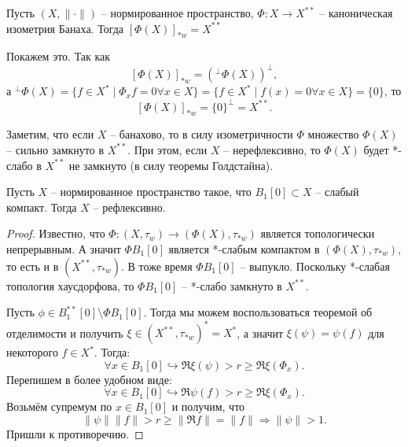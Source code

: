 \begin{note}\label{th:goldstein}
    Пусть $(X, \|\cdot\|)$ -- нормированное пространство, $\Phi\colon X \to X^{**}$ -- каноническая изометрия Банаха.
    Тогда $[\Phi(X)]_{*w} = X^{**}$

    Покажем это.
    Так как
    \[
        [\Phi(X)]_{*w} = (^\perp \Phi(X))^{\perp},
    \]
    а $^\perp \Phi(X) = \{f \in X^* \mid \Phi_x f = 0 \forall x \in X \} = \{f \in X^* \mid f(x) = 0 \forall x \in X\} = \{0\}$,
    то
    \[
        [\Phi(X)]_{*w} = \{0\}^{\perp} = X^{**}.
    \]
\end{note}
\begin{note}\label{cor:reflectia-criterion}
    Заметим, что если $X$ -- банахово, то в силу изометричности $\Phi$ множество $\Phi(X)$ -- сильно замкнуто в $X^{**}$.
    При этом, если $X$ -- нерефлексивно, то $\Phi(X)$ будет *-слабо в $X^{**}$ не замкнуто (в силу теоремы Голдстайна).
\end{note}
\begin{corollary}
    Пусть $X$ -- нормированное пространство такое, что $B_1[0] \subset X$ -- слабый компакт.
    Тогда $X$ -- рефлексивно.
\end{corollary}
\begin{proof}
    Известно, что $\Phi\colon (X, \tau_w) \to (\Phi(X), \tau_{*w})$ является топологически непрерывным.
    А значит $\Phi B_1[0]$ является *-слабым компактом в $(\Phi(X), \tau_{*w})$, то есть и в $(X^{**}, \tau_{*w})$.
    В тоже время $\Phi B_1[0]$ -- выпукло.
    Поскольку *-слабая топология хаусдорфова, то $\Phi B_1[0]$ -- *-слабо замкнуто в $X^{**}$.

    Пусть $\phi \in B_1^{**}[0] \setminus \Phi B_1[0]$.
    Тогда мы можем воспользоваться теоремой об отделимости и получить $\xi \in (X^{**}, \tau_{*w})^* = X^*$, а значит $\xi(\psi) = \psi(f)$ для некоторого $f \in X^*$.
    Тогда:
    \[
        \forall x \in B_1[0] \hookrightarrow \Re \xi(\psi) > r \geq \Re \xi(\Phi_x).
    \]
    Перепишем в более удобном виде:
    \[
        \forall x \in B_1[0] \hookrightarrow \Re \psi(f) > r \geq \Re \xi(\Phi_x).
    \]
    Возьмём супремум по $x \in B_1[0]$ и получим, что
    \[
        \|\psi \| \|f\| > r \geq \|\Re f\| = \|f\| \Rightarrow \|\psi \| > 1.
    \]
    Пришли к противоречию.
\end{proof}

